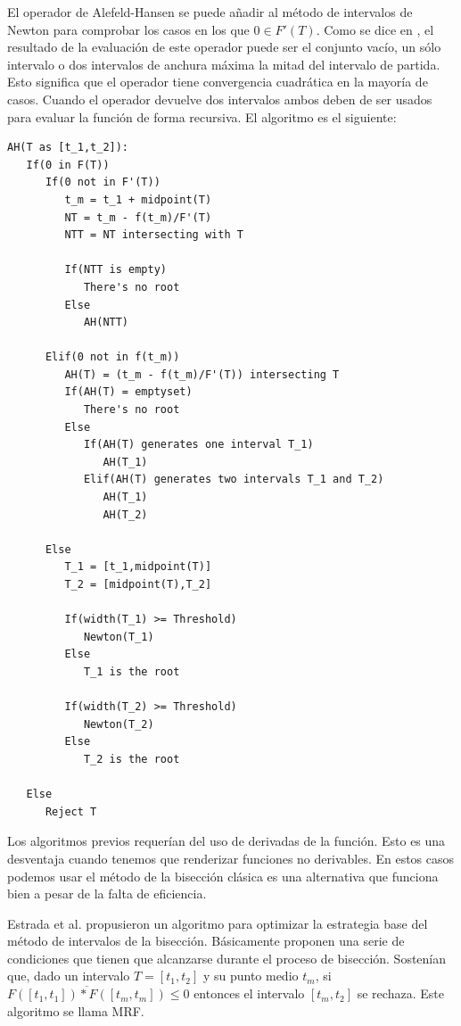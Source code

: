 El operador de Alefeld-Hansen se puede añadir al método de intervalos de Newton para comprobar los casos en los que $0 \in F'(T)$. Como se dice en \cite{Capriani00}, el resultado de la evaluación de este operador puede ser el conjunto vacío, un sólo intervalo o dos intervalos de anchura máxima la mitad del intervalo de partida. Esto significa que el operador tiene convergencia cuadrática en la mayoría de casos. Cuando el operador devuelve dos intervalos ambos deben de ser usados para evaluar la función de forma recursiva. El algoritmo es el siguiente:
\begin{verbatim}
AH(T as [t_1,t_2]):
   If(0 in F(T))
      If(0 not in F'(T))
         t_m = t_1 + midpoint(T)
         NT = t_m - f(t_m)/F'(T)
         NTT = NT intersecting with T
        
         If(NTT is empty)
            There's no root
         Else
            AH(NTT)
       
      Elif(0 not in f(t_m))
         AH(T) = (t_m - f(t_m)/F'(T)) intersecting T
         If(AH(T) = emptyset)
            There's no root
         Else
            If(AH(T) generates one interval T_1)
               AH(T_1)
            Elif(AH(T) generates two intervals T_1 and T_2)
               AH(T_1)
               AH(T_2)
         
      Else
         T_1 = [t_1,midpoint(T)]
         T_2 = [midpoint(T),T_2]         
         
         If(width(T_1) >= Threshold)
            Newton(T_1)
         Else
            T_1 is the root
            
         If(width(T_2) >= Threshold)
            Newton(T_2)
         Else
            T_2 is the root
         
   Else
      Reject T
\end{verbatim}

Los algoritmos previos requerían del uso de derivadas de la función. Esto es una desventaja cuando tenemos que renderizar funciones no derivables. En estos casos podemos usar el método de la bisección clásica es una alternativa que funciona bien a pesar de la falta de eficiencia.

Estrada et al. \cite{Estrada03}  propusieron un algoritmo para optimizar la estrategia base del método de intervalos de la bisección. Básicamente proponen una serie de condiciones que tienen que alcanzarse durante el proceso de bisección. Sostenían que, dado un intervalo $T = [t_1,t_2]$ y su punto medio $t_m$, si $\overline{F([t_1,t_1])*F([t_m,t_m])} \leq 0$ entonces el intervalo $[t_m,t_2]$ se rechaza. Este algoritmo se llama MRF.

